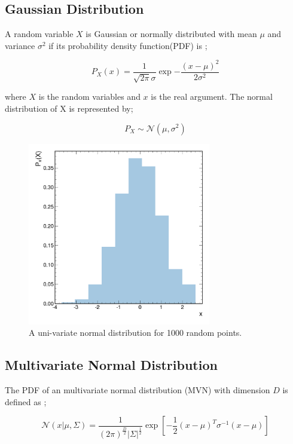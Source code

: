 \documentclass{article}
\begin{document}
\subsection{Gaussian Distribution}

A random variable $X$ is Gaussian or normally distributed with mean $\mu$ and variance $\sigma^{2}$ if its probability density function(PDF) is \cite{murphy2012machine};

\begin{equation}
P_{X}(x) = \frac{1}{\sqrt{2\pi}\sigma}\exp{-\frac{(x-\mu)^{2}}{2\sigma^{2}}}
\end{equation}

where $X$ is the random variables and $x$ is the real argument. The normal distribution of X is represented by;

\begin{equation}
P_{X} \sim \mathcal{N}(\mu, \sigma^{2})
\end{equation}

\begin{figure}
\centering
\includegraphics[width=8.0cm]{imgs/norm.png}
\caption{A uni-variate normal distribution for 1000 random points.}
\end{figure}

\subsection{Multivariate Normal Distribution}

The PDF of an multivariate normal distribution (MVN) with dimension $D$ is defined as \cite{murphy2012machine};

\begin{equation}
\mathcal{N}(x|\mu, \Sigma) = \frac{1}{(2\pi)^{\frac{D}{2}} |\Sigma|^{\frac{1}{2}}} \exp[{-\frac{1}{2}(x-\mu)^{T} \sigma^{-1}(x - \mu)}]
\end{equation}
\end{document}

